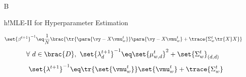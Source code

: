 \documentclass{article}
\begin{document}
\begin{question}
\begin{qpart}{B}
\begin{algo}[0.9\textwidth]{h!}{MLE-II for Hyperparameter Estimation}
\begin{enumerate}
\begin{enumerate}
							\begin{align*}
								\set{\beta^{t + 1}}^{-1}	&\eq	\frac{1}{N} \brac{\tr{\para{\vy - X \vmu_w^t}} \para{\vy - X \vmu_w^t} + \trace{\Sigma_w^t \tr{X} X}}
							\end{align*}
							\begin{align*}
								\forall\ d \in \brac{D},\ \set{\lambda_d^{t + 1}}^{-1}	&\eq	\set{\mu_{w, d}^t}^2 + \set{\Sigma_w^t}_{(d, d)}
							\end{align*}
							\begin{align*}
								\set{\lambda^{t + 1}}^{-1}	\eq	\tr{\set{\vmu_w^t}} \set{\vmu_w^t} + \trace{\Sigma_w^t}
							\end{align*}
					\end{enumerate}
			\end{enumerate}

		\end{algo}

	\end{qpart}

\end{question}
\end{document}
